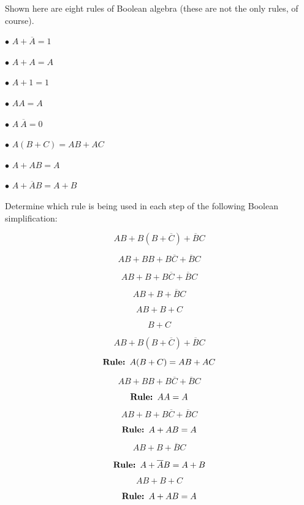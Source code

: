 

Shown here are eight rules of Boolean algebra (these are not the only rules, of course).  

\medskip
\item{$\bullet$} $A + \overline{A} = 1$
\item{$\bullet$} $A + A = A$
\item{$\bullet$} $A + 1 = 1$
\item{$\bullet$} $AA = A$
\item{$\bullet$} $A \> \overline{A} = 0$
\item{$\bullet$} $A(B + C) = AB + AC$
\item{$\bullet$} $A + AB = A$
\item{$\bullet$} $A + \overline{A}B = A + B$
\medskip

Determine which rule is being used in each step of the following Boolean simplification:

$$AB + B(B + \overline{C}) + \overline{B}C$$

$$AB + BB + B\overline{C} + \overline{B}C$$

$$AB + B + B\overline{C} + \overline{B}C$$

$$AB + B + \overline{B}C$$

$$AB + B + C$$

$$B + C$$







$$AB + B(B + \overline{C}) + \overline{B}C$$

$$\hbox{{\bf Rule: }} A(B + C) = AB + AC$$

$$AB + BB + B\overline{C} + \overline{B}C$$

$$\hbox{{\bf Rule: }} AA = A$$

$$AB + B + B\overline{C} + \overline{B}C$$

$$\hbox{{\bf Rule: }} A + AB = A$$

$$AB + B + \overline{B}C$$

$$\hbox{{\bf Rule: }} A + \overline{A}B = A + B$$

$$AB + B + C$$

$$\hbox{{\bf Rule: }} A + AB = A$$

